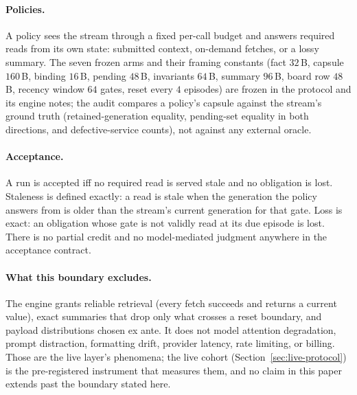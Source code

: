 \paragraph{Policies.} A policy sees the stream through a fixed
per-call budget and answers required reads from its own state:
submitted context, on-demand fetches, or a lossy summary. The
seven frozen arms and their framing constants
(fact $32$\,B, capsule $160$\,B, binding $16$\,B, pending
$48$\,B, invariants $64$\,B, summary $96$\,B, board row $48$\,B,
recency window $64$ gates, reset every $4$ episodes) are frozen in
the protocol and its engine notes; the audit compares a policy's
capsule against the stream's ground truth (retained-generation
equality, pending-set equality in both directions, and
defective-service counts), not against any external oracle.

\paragraph{Acceptance.} A run is accepted iff no required read is
served stale and no obligation is lost. Staleness is defined
exactly: a read is stale when the generation the policy answers
from is older than the stream's current generation for that gate.
Loss is exact: an obligation whose gate is not validly read at its
due episode is lost. There is no partial credit and no
model-mediated judgment anywhere in the acceptance contract.

\paragraph{What this boundary excludes.} The engine grants reliable
retrieval (every fetch succeeds and returns a current value),
exact summaries that drop only what crosses a reset boundary, and
payload distributions chosen ex ante. It does not model attention
degradation, prompt distraction, formatting drift, provider
latency, rate limiting, or billing. Those are the live layer's
phenomena; the live cohort
(Section~\ref{sec:live-protocol}) is the pre-registered instrument
that measures them, and no claim in this paper extends past the
boundary stated here.
